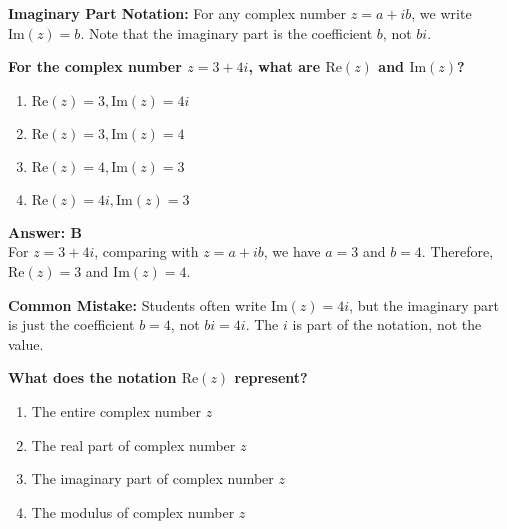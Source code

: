 \documentclass[12pt,a4paper]{article}
\begin{document}
\begin{conceptbox}
\textbf{Imaginary Part Notation:} For any complex number \( z = a + ib \), we write \( \text{Im}(z) = b \). Note that the imaginary part is the coefficient \( b \), not \( bi \).
\end{conceptbox}

\newpage
\begin{questiontitle}[MCQ 23]
\textbf{For the complex number \( z = 3 + 4i \), what are \( \text{Re}(z) \) and \( \text{Im}(z) \)?}
\end{questiontitle}

\begin{partbox}[Options]
\begin{enumerate}[label=\Alph*.]
    \item \( \text{Re}(z) = 3, \text{Im}(z) = 4i \)
    \item \( \text{Re}(z) = 3, \text{Im}(z) = 4 \)
    \item \( \text{Re}(z) = 4, \text{Im}(z) = 3 \)
    \item \( \text{Re}(z) = 4i, \text{Im}(z) = 3 \)
\end{enumerate}
\end{partbox}

\begin{answerstyle}
\textbf{Answer: B} \\
For \( z = 3 + 4i \), comparing with \( z = a + ib \), we have \( a = 3 \) and \( b = 4 \). Therefore, \( \text{Re}(z) = 3 \) and \( \text{Im}(z) = 4 \).
\end{answerstyle}

\begin{conceptbox}
\textbf{Common Mistake:} Students often write \( \text{Im}(z) = 4i \), but the imaginary part is just the coefficient \( b = 4 \), not \( bi = 4i \). The \( i \) is part of the notation, not the value.
\end{conceptbox}

\newpage
\begin{questiontitle}[MCQ 24]
\textbf{What does the notation \( \text{Re}(z) \) represent?}
\end{questiontitle}

\begin{partbox}[Options]
\begin{enumerate}[label=\Alph*.]
    \item The entire complex number \( z \)
    \item The real part of complex number \( z \)
    \item The imaginary part of complex number \( z \)
    \item The modulus of complex number \( z \)
\end{enumerate}
\end{partbox}
\end{document}
